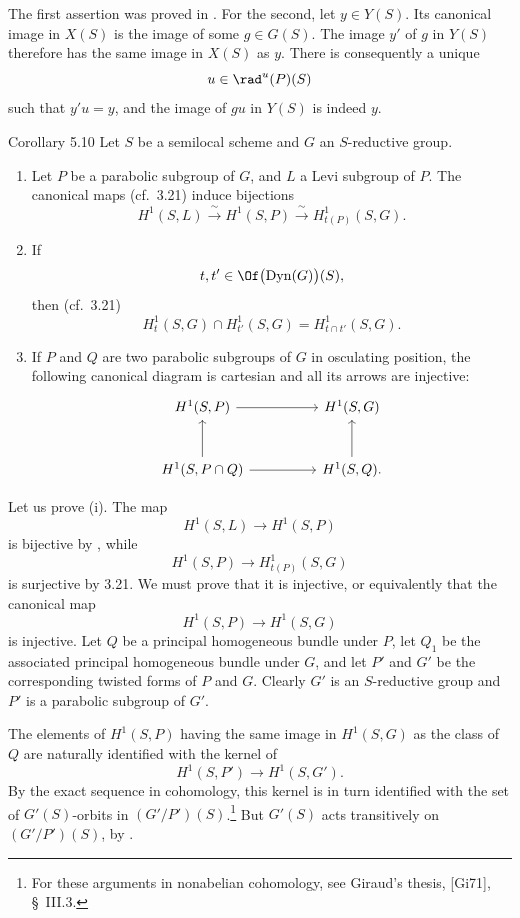 The first assertion was proved in .  For the second, let
\(y\in Y(S)\).  Its canonical image in \(X(S)\) is the image of some
\(g\in G(S)\).  The image \(y'\) of \(g\) in \(Y(S)\) therefore has
the same image in \(X(S)\) as \(y\).  There is consequently a unique
\[
 u\in\rad^u(P)(S)
\]
such that \(y'u=y\), and the image of \(gu\) in \(Y(S)\) is indeed
\(y\).

\begin{sgastatement}{Corollary 5.10}
Let \(S\) be a semilocal scheme and \(G\) an \(S\)-reductive group.
\begin{enumerate}[label=\textup{(\roman*)}]
\item Let \(P\) be a parabolic subgroup of \(G\), and \(L\) a Levi
subgroup of \(P\).  The canonical maps \textup{(cf.\ 3.21)}
induce bijections
\[
 H^1(S,L)\xrightarrow{\ \sim\ }H^1(S,P)
       \xrightarrow{\ \sim\ }H^1_{t(P)}(S,G).
\]
\item If
\[
 t,t'\in\Of\bigl(\operatorname{Dyn}(G)\bigr)(S),
\]
then \textup{(cf.\ 3.21)}
\[
 H^1_t(S,G)\cap H^1_{t'}(S,G)=H^1_{t\cap t'}(S,G).
\]
\item If \(P\) and \(Q\) are two parabolic subgroups of \(G\) in
osculating position, the following canonical diagram is cartesian
and all its arrows are injective:
\[
\begin{tikzcd}[column sep=huge,row sep=large]
 H^1(S,P) \arrow[r] & H^1(S,G)\\
 H^1(S,P\cap Q) \arrow[u] \arrow[r] & H^1(S,Q). \arrow[u]
\end{tikzcd}
\]
\end{enumerate}
\end{sgastatement}

Let us prove \textup{(i)}.  The map
\[
 H^1(S,L)\longrightarrow H^1(S,P)
\]
is bijective by , while
\[
 H^1(S,P)\longrightarrow H^1_{t(P)}(S,G)
\]
is surjective by 3.21.  We must prove that it is injective, or
equivalently that the canonical map
\[
 H^1(S,P)\longrightarrow H^1(S,G)
\]
is injective.  Let \(Q\) be a principal homogeneous bundle under
\(P\), let \(Q_1\) be the associated principal homogeneous bundle
under \(G\), and let \(P'\) and \(G'\) be the corresponding twisted
forms of \(P\) and \(G\).  Clearly \(G'\) is an \(S\)-reductive group
and \(P'\) is a parabolic subgroup of \(G'\).

The elements of \(H^1(S,P)\) having the same image in \(H^1(S,G)\)
as the class of \(Q\) are naturally identified with the kernel of
\[
 H^1(S,P')\longrightarrow H^1(S,G').
\]
By the exact sequence in cohomology, this kernel is in turn
identified with the set of \(G'(S)\)-orbits in
\((G'/P')(S)\).\footnote{For these arguments in nonabelian
cohomology, see Giraud's thesis, \textup{[Gi71]}, \S~III.3.}
But \(G'(S)\) acts transitively on \((G'/P')(S)\), by .

